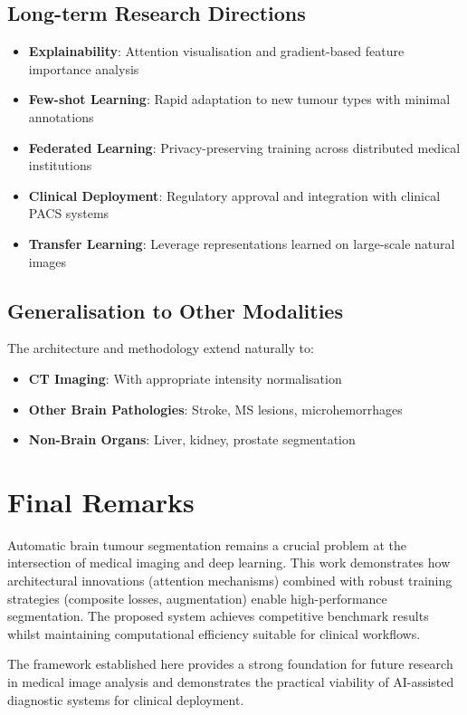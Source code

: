 \documentclass{ecsproject}     %
\begin{document}
\subsection{Long-term Research Directions}

\begin{itemize}
    \item \textbf{Explainability}: Attention visualisation and gradient-based feature importance analysis
    \item \textbf{Few-shot Learning}: Rapid adaptation to new tumour types with minimal annotations
    \item \textbf{Federated Learning}: Privacy-preserving training across distributed medical institutions
    \item \textbf{Clinical Deployment}: Regulatory approval and integration with clinical PACS systems
    \item \textbf{Transfer Learning}: Leverage representations learned on large-scale natural images
\end{itemize}

\subsection{Generalisation to Other Modalities}

The architecture and methodology extend naturally to:
\begin{itemize}
    \item \textbf{CT Imaging}: With appropriate intensity normalisation
    \item \textbf{Other Brain Pathologies}: Stroke, MS lesions, microhemorrhages
    \item \textbf{Non-Brain Organs}: Liver, kidney, prostate segmentation
\end{itemize}

\section{Final Remarks}

Automatic brain tumour segmentation remains a crucial problem at the intersection of medical imaging and deep learning. This work demonstrates how architectural innovations (attention mechanisms) combined with robust training strategies (composite losses, augmentation) enable high-performance segmentation. The proposed system achieves competitive benchmark results whilst maintaining computational efficiency suitable for clinical workflows.

The framework established here provides a strong foundation for future research in medical image analysis and demonstrates the practical viability of AI-assisted diagnostic systems for clinical deployment.


\end{document}
